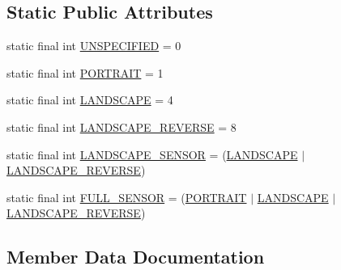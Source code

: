 \subsection*{Static Public Attributes}
\begin{DoxyCompactItemize}
\item 
static final int \hyperlink{classcom_1_1toast_1_1android_1_1gamebase_1_1base_1_1_screen_orientation_a5642b437d35587f1b800ed579d2c4b98}{U\+N\+S\+P\+E\+C\+I\+F\+I\+ED} = 0
\item 
static final int \hyperlink{classcom_1_1toast_1_1android_1_1gamebase_1_1base_1_1_screen_orientation_a26527ca2b55203099177957bb26f056b}{P\+O\+R\+T\+R\+A\+IT} = 1
\item 
static final int \hyperlink{classcom_1_1toast_1_1android_1_1gamebase_1_1base_1_1_screen_orientation_a35e69f97c6f0d1500005819ab6c250d5}{L\+A\+N\+D\+S\+C\+A\+PE} = 4
\item 
static final int \hyperlink{classcom_1_1toast_1_1android_1_1gamebase_1_1base_1_1_screen_orientation_ab8d358e427d8098c13c46747186d3ce7}{L\+A\+N\+D\+S\+C\+A\+P\+E\+\_\+\+R\+E\+V\+E\+R\+SE} = 8
\item 
static final int \hyperlink{classcom_1_1toast_1_1android_1_1gamebase_1_1base_1_1_screen_orientation_a6de0b643c395c21e881b878be079e0ba}{L\+A\+N\+D\+S\+C\+A\+P\+E\+\_\+\+S\+E\+N\+S\+OR} = (\hyperlink{classcom_1_1toast_1_1android_1_1gamebase_1_1base_1_1_screen_orientation_a35e69f97c6f0d1500005819ab6c250d5}{L\+A\+N\+D\+S\+C\+A\+PE} $\vert$ \hyperlink{classcom_1_1toast_1_1android_1_1gamebase_1_1base_1_1_screen_orientation_ab8d358e427d8098c13c46747186d3ce7}{L\+A\+N\+D\+S\+C\+A\+P\+E\+\_\+\+R\+E\+V\+E\+R\+SE})
\item 
static final int \hyperlink{classcom_1_1toast_1_1android_1_1gamebase_1_1base_1_1_screen_orientation_a0824328defe5c2dc4c9898b8bc7c6ddf}{F\+U\+L\+L\+\_\+\+S\+E\+N\+S\+OR} = (\hyperlink{classcom_1_1toast_1_1android_1_1gamebase_1_1base_1_1_screen_orientation_a26527ca2b55203099177957bb26f056b}{P\+O\+R\+T\+R\+A\+IT} $\vert$ \hyperlink{classcom_1_1toast_1_1android_1_1gamebase_1_1base_1_1_screen_orientation_a35e69f97c6f0d1500005819ab6c250d5}{L\+A\+N\+D\+S\+C\+A\+PE} $\vert$ \hyperlink{classcom_1_1toast_1_1android_1_1gamebase_1_1base_1_1_screen_orientation_ab8d358e427d8098c13c46747186d3ce7}{L\+A\+N\+D\+S\+C\+A\+P\+E\+\_\+\+R\+E\+V\+E\+R\+SE})
\end{DoxyCompactItemize}


\subsection{Member Data Documentation}
\mbox{\label{classcom_1_1toast_1_1android_1_1gamebase_1_1base_1_1_screen_orientation_a0824328defe5c2dc4c9898b8bc7c6ddf}} 
